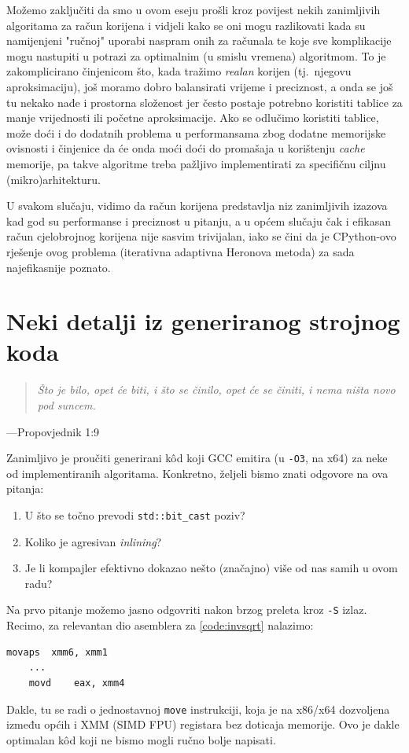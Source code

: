 \documentclass[12pt]{scrartcl}
\newcommand{\citat}[2]{\begin{quotation}\textit{#1}\end{quotation}\begin{flushright}---#2\end{flushright}}
\begin{document}
Možemo zaključiti da smo u ovom eseju prošli kroz povijest nekih zanimljivih algoritama za račun korijena i vidjeli kako se oni mogu razlikovati
kada su namijenjeni "ručnoj" uporabi naspram onih za računala te koje sve komplikacije mogu nastupiti u potrazi za optimalnim
(u smislu vremena) algoritmom. To je
zakomplicirano činjenicom što, kada tražimo \emph{realan} korijen (tj.\ njegovu aproksimaciju), još moramo dobro balansirati vrijeme i preciznost, a
onda se još tu nekako nađe i prostorna složenost jer često postaje potrebno koristiti tablice za manje vrijednosti ili početne aproksimacije.
Ako se odlučimo koristiti tablice, može doći i do dodatnih problema u performansama zbog dodatne memorijske ovisnosti i činjenice da će onda
moći doći do promašaja u korištenju \textsl{cache} memorije, pa takve algoritme treba pažljivo implementirati za specifičnu ciljnu (mikro)arhitekturu.

U svakom slučaju, vidimo da račun korijena predstavlja niz zanimljivih izazova kad god su performanse i preciznost u pitanju, a u općem slučaju čak i
efikasan račun cjelobrojnog korijena nije sasvim trivijalan, iako se čini da je CPython-ovo rješenje ovog problema (iterativna adaptivna Heronova
metoda) za sada najefikasnije poznato.

\appendix
\section{Neki detalji iz generiranog strojnog koda}
\citat{Što je bilo, opet će biti, i što se činilo, opet će se činiti, i nema ništa novo pod suncem.}{Propovjednik 1:9}
Zanimljivo je proučiti generirani k\^od koji GCC emitira
 (u \verb|-O3|, na x64) za neke od implementiranih algoritama. Konkretno, željeli bismo znati odgovore na ova pitanja:
\begin{enumerate}
    \item U što se točno prevodi \verb|std::bit_cast| poziv?
    \item Koliko je agresivan \textsl{inlining}?
    \item Je li kompajler efektivno dokazao nešto (značajno) više od nas samih u ovom radu?
\end{enumerate}
Na prvo pitanje možemo jasno odgovriti nakon brzog preleta kroz \verb|-S| izlaz. Recimo, za relevantan dio asemblera za \autoref{code:invsqrt}
nalazimo:
\begin{lstlisting}[label=code:asm1]
	movaps	xmm6, xmm1
	...
	movd	eax, xmm4
\end{lstlisting}
Dakle, tu se radi o jednostavnoj \verb|move| instrukciji, koja je na x86/x64 dozvoljena između općih i XMM (SIMD FPU) registara bez doticaja
memorije. Ovo je dakle
optimalan k\^od koji ne bismo mogli ručno bolje napisati.
\end{document}
